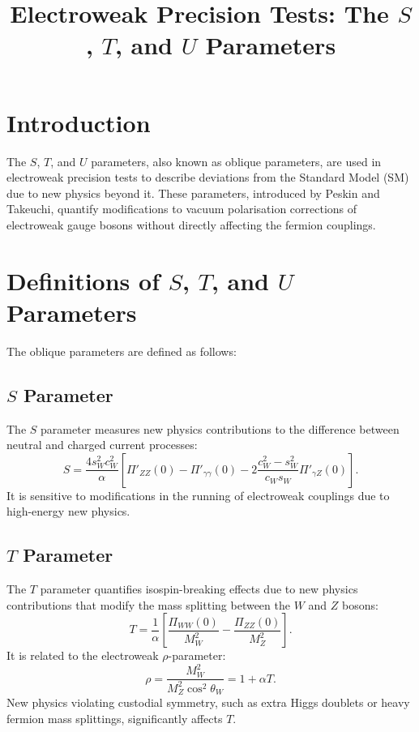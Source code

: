\documentclass[a4paper,12pt]{article}
\begin{document}
 
\title{Electroweak Precision Tests: The $S$, $T$, and $U$ Parameters}
\author{}
\date{}
\maketitle
 
\section{Introduction}
 
The $S$, $T$, and $U$ parameters, also known as oblique parameters, are used in electroweak precision tests to describe deviations from the Standard Model (SM) due to new physics beyond it. These parameters, introduced by Peskin and Takeuchi, quantify modifications to vacuum polarisation corrections of electroweak gauge bosons without directly affecting the fermion couplings.
 
\section{Definitions of $S$, $T$, and $U$ Parameters}
 
The oblique parameters are defined as follows:
 
\subsection{$S$ Parameter}
 
The $S$ parameter measures new physics contributions to the difference between neutral and charged current processes:
\begin{equation}
S = \frac{4s_W^2c_W^2}{\alpha} \left[ \Pi'_{ZZ}(0) - \Pi'_{\gamma\gamma}(0) - 2\frac{c_W^2 - s_W^2}{c_Ws_W} \Pi'_{\gamma Z}(0) \right].
\end{equation}
It is sensitive to modifications in the running of electroweak couplings due to high-energy new physics.
 
\subsection{$T$ Parameter}
 
The $T$ parameter quantifies isospin-breaking effects due to new physics contributions that modify the mass splitting between the $W$ and $Z$ bosons:
\begin{equation}
T = \frac{1}{\alpha} \left[ \frac{\Pi_{WW}(0)}{M_W^2} - \frac{\Pi_{ZZ}(0)}{M_Z^2} \right].
\end{equation}
It is related to the electroweak $\rho$-parameter:
\begin{equation}
\rho = \frac{M_W^2}{M_Z^2 \cos^2 \theta_W} = 1 + \alpha T.
\end{equation}
New physics violating custodial symmetry, such as extra Higgs doublets or heavy fermion mass splittings, significantly affects $T$.
 
\end{document}
